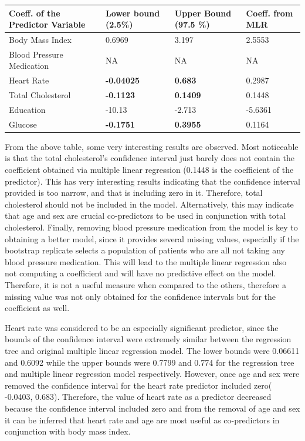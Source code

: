 \documentclass{article}\usepackage[]{graphicx}\usepackage[]{color}
\begin{document}
\begin{table}[h]
\begin{small}
    \begin{tabular}{llll}
    \hline \textbf{Coeff. of the Predictor Variable} & \textbf{Lower bound (2.5\%)} & \textbf{Upper Bound (97.5 \%)} & \textbf{Coeff. from MLR} \\ \hline
    Body Mass Index             & 0.6969            & 3.197    &    2.5553       \\
    Blood Pressure Medication             & NA               & NA        & NA              \\
    Heart Rate           & \textbf{-0.04025}         & \textbf{0.683}  &      0.2987        \\
    Total Cholesterol       & \textbf{-0.1123}       & \textbf{0.1409}   & 0.1448           \\
    Education            & -10.13             & -2.713    & -5.6361             \\
    Glucose         & \textbf{-0.1751}      & \textbf{0.3955}    & 0.1164             \\
    \end{tabular}
    \end{small}
\end{table}

From the above table, some very interesting results are observed.  Most noticeable is that the total cholesterol's confidence interval just barely does not contain the coefficient obtained via multiple linear regression (0.1448 is the coefficient of the predictor).  This has very interesting results indicating that the confidence interval provided is too narrow, and that is including zero in it. Therefore, total cholesterol should not be included in the model.  Alternatively, this may indicate that age and sex are crucial co-predictors to be used in conjunction with total cholesterol.  Finally, removing blood pressure medication from the model is key to obtaining a better model, since it provides several missing values, especially if the bootstrap replicate selects a population of patients who are all not taking any blood pressure medication.  This will lead to the multiple linear regression also not computing a coefficient and will have no predictive effect on the model.  Therefore, it is not a useful measure when compared to the others, therefore a missing value was not only obtained for the confidence intervals but for the coefficient as well. 

Heart rate was considered to be an especially significant predictor, since the bounds of the confidence interval were extremely similar between the regression tree and  original multiple linear regression model.  The lower bounds were  0.06611 and 0.6092 while the upper bounds were 0.7799 and 0.774 for the regression tree and multiple linear regression model respectively.  However, once age and sex were removed the confidence interval for the heart rate predictor included zero( -0.0403, 0.683).  Therefore, the value of heart rate as a predictor decreased because the confidence interval included zero and from the removal of age and sex it can be inferred that heart rate and age are most useful as co-predictors in conjunction with body mass index.
\end{document}
